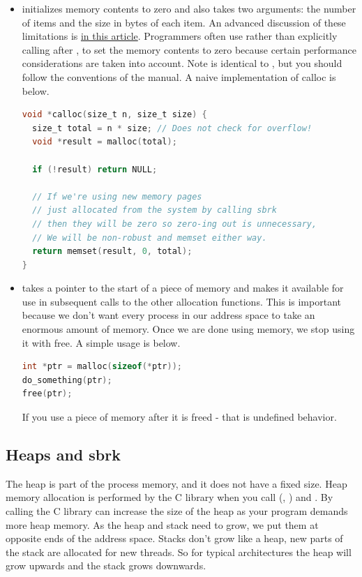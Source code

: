 \begin{itemize}
\begin{lstlisting}[language=C]
}
\end{lstlisting}

\item {} initializes memory contents to zero and also takes two arguments: the number of items and the size in bytes of each item.
An advanced discussion of these limitations is \href{http://locklessinc.com/articles/calloc/}{in this article}.
Programmers often use  rather than explicitly calling  after , to set the memory contents to zero because certain performance considerations are taken into account.
Note  is identical to , but you should follow the conventions of the manual.
A naive implementation of calloc is below.

\begin{lstlisting}[language=C]
void *calloc(size_t n, size_t size) {
  size_t total = n * size; // Does not check for overflow!
  void *result = malloc(total);

  if (!result) return NULL;

  // If we're using new memory pages
  // just allocated from the system by calling sbrk
  // then they will be zero so zero-ing out is unnecessary,
  // We will be non-robust and memset either way.
  return memset(result, 0, total);
}
\end{lstlisting}

\item {} takes a pointer to the start of a piece of memory and makes it available for use in subsequent calls to the other allocation functions.
This is important because we don't want every process in our address space to take an enormous amount of memory.
Once we are done using memory, we stop using it with free.
A simple usage is below.

\begin{lstlisting}[language=C]
int *ptr = malloc(sizeof(*ptr));
do_something(ptr);
free(ptr);
\end{lstlisting}

If you use a piece of memory after it is freed - that is undefined behavior.

\end{itemize}

\subsection{Heaps and sbrk}

The heap is part of the process memory, and it does not have a fixed size.
Heap memory allocation is performed by the C library when you call  (, ) and .
By calling  the C library can increase the size of the heap as your program demands more heap memory.
As the heap and stack need to grow, we put them at opposite ends of the address space.
Stacks don't grow like a heap, new parts of the stack are allocated for new threads.
So for typical architectures the heap will grow upwards and the stack grows downwards.

